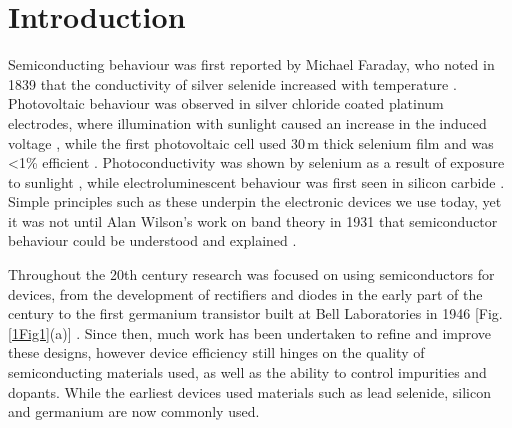 
\chapter{Introduction}

\graphicspath{{Chapter1/Figures/}}

Semiconducting behaviour was first reported by Michael Faraday, who noted in 1839 that the conductivity of silver selenide increased with temperature \cite{Faraday2012}. Photovoltaic behaviour was observed in silver chloride coated platinum electrodes, where illumination with sunlight caused an increase in the induced voltage \cite{Becquerel1839}, while the first photovoltaic cell used 30\,\textmu m thick selenium film and was <1\% efficient \cite{Fritts1883}. Photoconductivity was shown by selenium as a result of exposure to sunlight \cite{Smith1873, Adams1876}, while electroluminescent behaviour was first seen in silicon carbide \cite{Round1907}. Simple principles such as these underpin the electronic devices we use today, yet it was not until Alan Wilson's work on band theory in 1931 that semiconductor behaviour could be understood and explained \cite{Wilson1931}. 

Throughout the 20th century research was focused on using semiconductors for devices, from the development of rectifiers and diodes in the early part of the century \cite{Jenkins2005} to the first germanium transistor built at Bell Laboratories in 1946 [Fig.\,\ref{1Fig1}(a)] \cite{TransistorHist}. Since then, much work has been undertaken to refine and improve these designs, however device efficiency still hinges on the quality of semiconducting materials used, as well as the ability to control impurities and dopants. While the earliest devices used materials such as lead selenide, silicon and germanium are now commonly used.

